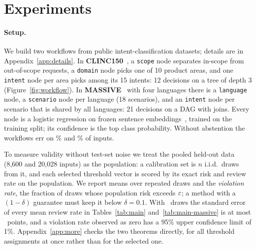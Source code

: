 \section{Experiments}\label{sec:exp}

\paragraph{Setup.} We build two workflows from public intent-classification datasets; details
are in Appendix~\ref{app:details}. In \textbf{CLINC150}~\citep{larson2019clinc}, a
\texttt{scope} node separates in-scope from out-of-scope requests, a \texttt{domain} node
picks one of 10 product areas, and one \texttt{intent} node per area picks among its 15
intents: 12 decisions on a tree of depth 3 (Figure~\ref{fig:workflow}).
In \textbf{MASSIVE}~\citep{fitzgerald2022massive} with four languages there is a
\texttt{language} node, a
\texttt{scenario} node per language (18 scenarios), and an \texttt{intent} node per scenario
that is shared by all languages: 21 decisions on a DAG with joins. Every node is a logistic
regression on frozen sentence embeddings~\citep{reimers2019sbert}, trained on the training
split; its confidence is the top class probability. Without abstention the workflows err on
\FreeErrClinc\% and \FreeErrMassive\% of inputs.

To measure validity without test-set noise we treat the pooled held-out data (8{,}600 and
20{,}028 inputs) as the population: a calibration set is $n$ i.i.d.\ draws from it, and each
selected threshold vector is scored by its exact risk and review rate on the population. We
report means over repeated draws and the \emph{violation rate}, the fraction of draws whose
population risk exceeds $\varepsilon$; a method with a $(1-\delta)$ guarantee must keep it below
$\delta=0.1$. With \Trials\ draws the standard error of every mean review rate in
Tables~\ref{tab:main} and~\ref{tab:main-massive} is at most \MaxSeReview\ points, and a
violation rate observed as zero has a 95\% upper confidence limit of 1\%.
Appendix~\ref{app:more} checks the two theorems directly, for all threshold assignments at
once rather than for the selected one.

